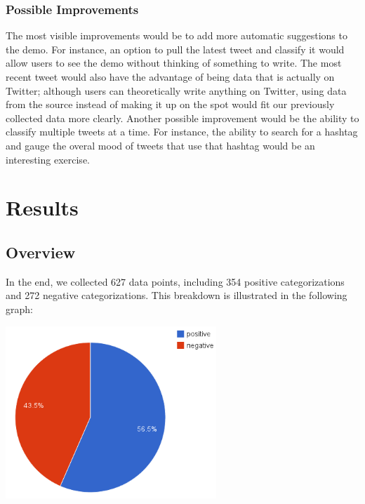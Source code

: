 \documentclass[12pt,a4paper]{article}
\begin{document}
\subsubsection{Possible Improvements}
The most visible improvements would be to add more automatic suggestions to the demo. For instance, an option to pull the latest tweet and classify it would allow users to see the demo without thinking of something to write. The most recent tweet would also have the advantage of being data that is actually on Twitter; although users can theoretically write anything on Twitter, using data from the source instead of making it up on the spot would fit our previously collected data more clearly. Another possible improvement would be the ability to classify multiple tweets at a time. For instance, the ability to search for a hashtag and gauge the overal mood of tweets that use that hashtag would be an interesting exercise.

\section { Results }

\subsection{Overview}

In the end, we collected 627 data points, including 354 positive categorizations and 272 negative categorizations. This breakdown is illustrated in the following graph:

\begin{center}
\includegraphics[width=300px]{figs/pos_neg_breakdown.png}
\end{center}
\end{document}
